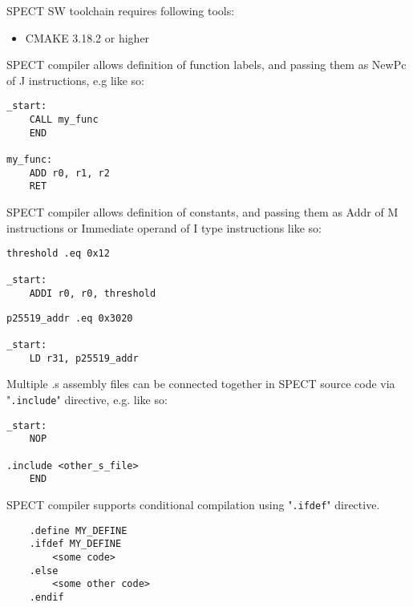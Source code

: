 \documentclass{tropic_design_spec}
\begin{document}

SPECT SW toolchain requires following tools:
\begin{itemize}
    \item CMAKE 3.18.2 or higher
\end{itemize}


SPECT compiler allows definition of function labels, and passing them
as NewPc of J instructions, e.g like so:

\begin{lstlisting}
_start:
    CALL my_func
    END

my_func:
    ADD r0, r1, r2
    RET
\end{lstlisting}


SPECT compiler allows definition of constants, and passing them as
Addr of M instructions or Immediate operand of I type instructions like so:

\begin{lstlisting}
threshold .eq 0x12

_start:
    ADDI r0, r0, threshold
\end{lstlisting}

\begin{lstlisting}
p25519_addr .eq 0x3020

_start:
    LD r31, p25519_addr
\end{lstlisting}



Multiple .s assembly files can be connected together in SPECT source code
via "\texttt{.include}" directive, e.g. like so:

\begin{lstlisting}
_start:
    NOP

.include <other_s_file>
    END
\end{lstlisting}


SPECT compiler supports conditional compilation using "\texttt{.ifdef}" directive.

\begin{lstlisting}
    .define MY_DEFINE
    .ifdef MY_DEFINE
        <some code>
    .else
        <some other code>
    .endif
\end{lstlisting}
\end{document}
